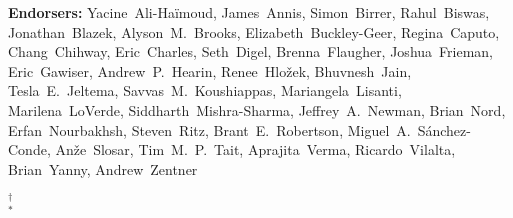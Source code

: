 \begin{raggedright}
\textbf{Endorsers:}
Yacine~Ali-Ha\"imoud,
James~Annis,
Simon~Birrer,
Rahul~Biswas,
Jonathan~Blazek,
Alyson~M.~Brooks,
Elizabeth~Buckley-Geer,
Regina~Caputo,
Chang~Chihway,
Eric~Charles,
Seth~Digel,
Brenna~Flaugher,
Joshua~Frieman,
Eric~Gawiser,
Andrew~P.~Hearin,
Renee~Hlo\v{z}ek,
Bhuvnesh~Jain,
Tesla~E.~Jeltema,
Savvas~M.~Koushiappas,
Mariangela~Lisanti,
Marilena~LoVerde,
Siddharth~Mishra-Sharma,
Jeffrey~A.~Newman,
Brian~Nord,
Erfan~Nourbakhsh,
Steven~Ritz,
Brant~E.~Robertson,
Miguel~A.~S\'anchez-Conde,
An\v{z}e~Slosar,
Tim~M.~P.~Tait,
Aprajita~Verma,
Ricardo~Vilalta,
Brian~Yanny,
Andrew~Zentner


$^\dagger$  \\
$^*$ 

\begin{multicols}{2}
\scriptsize
\parskip=4pt


\end{multicols}
\end{raggedright}

